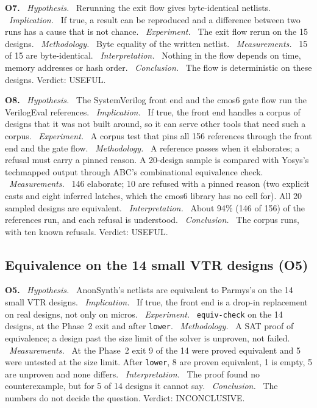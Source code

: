\documentclass[conference]{IEEEtran}
\newcommand{\code}[1]{\texttt{#1}}
\newcommand{\argid}[1]{\par\smallskip\noindent\textbf{#1.}}
\newcommand{\ah}[1]{\ \textit{#1.}\ }
\begin{document}
\argid{O7}
\ah{Hypothesis} Rerunning the exit flow gives byte-identical netlists.
\ah{Implication} If true, a result can be reproduced and a difference between two runs has a cause that is not chance.
\ah{Experiment} The exit flow rerun on the 15 designs.
\ah{Methodology} Byte equality of the written netlist.
\ah{Measurements} 15 of 15 are byte-identical.
\ah{Interpretation} Nothing in the flow depends on time, memory addresses or hash order.
\ah{Conclusion} The flow is deterministic on these designs. Verdict: USEFUL.

\argid{O8}
\ah{Hypothesis} The SystemVerilog front end and the cmos6 gate flow run the VerilogEval references.
\ah{Implication} If true, the front end handles a corpus of designs that it was not built around, so it can serve other tools that need such a corpus.
\ah{Experiment} A corpus test that pins all 156 references through the front end and the gate flow.
\ah{Methodology} A reference passes when it elaborates; a refusal must carry a pinned reason. A 20-design sample is compared with Yosys's techmapped output through ABC's combinational equivalence check.
\ah{Measurements} 146 elaborate; 10 are refused with a pinned reason (two explicit casts and eight inferred latches, which the cmos6 library has no cell for). All 20 sampled designs are equivalent.
\ah{Interpretation} About 94\% (146 of 156) of the references run, and each refusal is understood.
\ah{Conclusion} The corpus runs, with ten known refusals. Verdict: USEFUL.

\subsection{Equivalence on the 14 small VTR designs (O5)}

\argid{O5}
\ah{Hypothesis} AnonSynth's netlists are equivalent to Parmys's on the 14 small VTR designs.
\ah{Implication} If true, the front end is a drop-in replacement on real designs, not only on micros.
\ah{Experiment} \code{equiv-check} on the 14 designs, at the Phase~2 exit and after \code{lower}.
\ah{Methodology} A SAT proof of equivalence; a design past the size limit of the solver is unproven, not failed.
\ah{Measurements} At the Phase~2 exit 9 of the 14 were proved equivalent and 5 were untested at the size limit. After \code{lower}, 8 are proven equivalent, 1 is empty, 5 are unproven and none differs.
\ah{Interpretation} The proof found no counterexample, but for 5 of 14 designs it cannot say.
\ah{Conclusion} The numbers do not decide the question. Verdict: INCONCLUSIVE.
\end{document}
